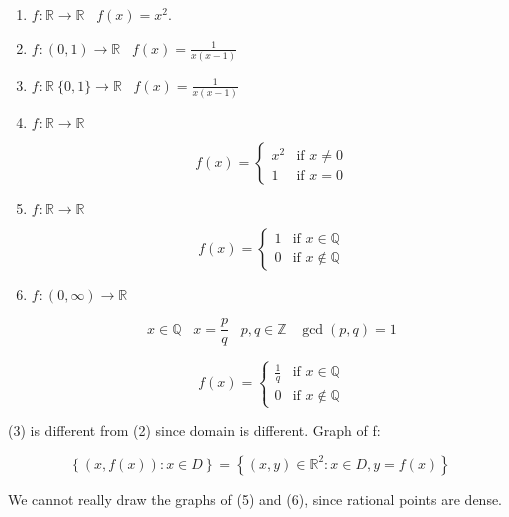 \documentclass[12pt]{scrbook}
\begin{document}
\begin{enumerate}
	\item
	 $ f : \mathbb{R} \rightarrow \mathbb{R} \;\;\; f(x) = x^2 $.

	\item 
	$f : (0, 1)  \rightarrow \mathbb{R} \;\;\; f(x) = \frac{1}{x(x-1)} $

	\item 
	$f : \mathbb{R} \ \{0,1\} \rightarrow \mathbb{R} \;\;\; f(x) = \frac{1}{x(x-1)} $
	
	\item 
	$f : \mathbb{R} \rightarrow \mathbb{R} $
	
	\[ 
	f(x) = \left\{ \begin{array}{ll}
         x^2 & \mbox{if $x \neq 0$} \\
        1 & \mbox{if $x = 0$}
         \end{array} 
         \right. 
         \] 
         
         \item
         $f : \mathbb{R} \rightarrow \mathbb{R} $
         
         	\[ 
	f(x) = \left\{ \begin{array}{ll}
         1 & \mbox{if $x \in \mathbb{Q} $} \\
         0 & \mbox{if $x \notin \mathbb{Q} $}
         \end{array} 
         \right. 
         \] 
	
	\item
         $f : (0, \infty) \rightarrow \mathbb{R} $
         
         \[ x \in \mathbb{Q} \;\;\; x = \frac{p}{q} \;\;\; p, q \in \mathbb{Z} \;\;\; \gcd(p, q) = 1 \] 
         
         	\[ 
	f(x) = \left\{ \begin{array}{ll}
         \frac{1}{q} & \mbox{if $x \in \mathbb{Q} $} \\
         0 & \mbox{if $x \notin \mathbb{Q} $}
         \end{array} 
         \right. 
         \] 

\end{enumerate}

(3) is different from (2) since domain is different. Graph of f:

\[ \left\{ (x, f(x)) : x \in D \right\}  =  \left\{ (x, y) \in \mathbb{R}^2 :  x \in D, y = f(x) \right\} \]

We cannot really draw the graphs of (5) and (6), since rational points are dense.
\end{document}
